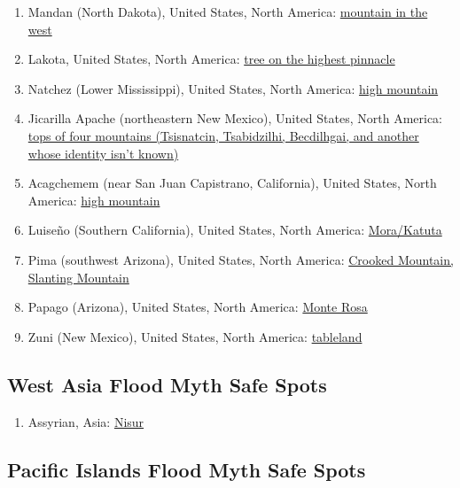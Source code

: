 \documentclass[10pt,twocolumn,letterpaper]{article}
\begin{document}
\begin{flushleft}
\begin{enumerate}
\item Mandan (North Dakota), United States, North America: \href{http://www.talkorigins.org/faqs/flood-myths.html#Mandan}{mountain in the west}
\item Lakota, United States, North America: \href{http://www.talkorigins.org/faqs/flood-myths.html#Lakota}{tree on the highest pinnacle}
\item Natchez (Lower Mississippi), United States, North America: \href{http://www.talkorigins.org/faqs/flood-myths.html#Natchez}{high mountain}
\item Jicarilla Apache (northeastern New Mexico), United States, North America: \href{http://www.talkorigins.org/faqs/flood-myths.html#Jicarilla}{tops of four mountains (Tsisnatcin, Tsabidzilhi, Becdilhgai, and another whose identity isn't known)}
\item Acagchemem (near San Juan Capistrano, California), United States, North America: \href{http://www.talkorigins.org/faqs/flood-myths.html#Acagchemem}{high mountain}
\item Luiseño (Southern California), United States, North America: \href{http://www.talkorigins.org/faqs/flood-myths.html#Luiseno}{Mora/Katuta}
\item Pima (southwest Arizona), United States, North America: \href{http://www.talkorigins.org/faqs/flood-myths.html#Pima}{Crooked Mountain, Slanting Mountain}
\item Papago (Arizona), United States, North America: \href{http://www.talkorigins.org/faqs/flood-myths.html#Papago}{Monte Rosa}
\item Zuni (New Mexico), United States, North America: \href{http://www.talkorigins.org/faqs/flood-myths.html#Zuni}{tableland}
\end{enumerate}
\end{flushleft}

\subsection{West Asia Flood Myth Safe Spots}

\begin{flushleft}
\begin{enumerate}
\item Assyrian, Asia: \href{http://www.talkorigins.org/faqs/flood-myths.html#Assyrian}{Nisur}
\end{enumerate}
\end{flushleft}

\subsection{Pacific Islands Flood Myth Safe Spots}
\end{document}
